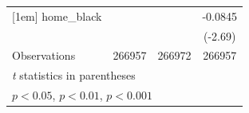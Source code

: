 \begin{table}[htbp]
\begin{tabular}{l*{3}{c}}
[1em]
home\_black          &                     &                     &     -0.0845\sym{**} \\
                    &                     &                     &     (-2.69)         \\
\hline
Observations        &      266957         &      266972         &      266957         \\
\hline\hline
\multicolumn{4}{l}{\footnotesize \textit{t} statistics in parentheses}\\
\multicolumn{4}{l}{\footnotesize \sym{*} \(p<0.05\), \sym{**} \(p<0.01\), \sym{***} \(p<0.001\)}\\
\end{tabular}
\end{table}
